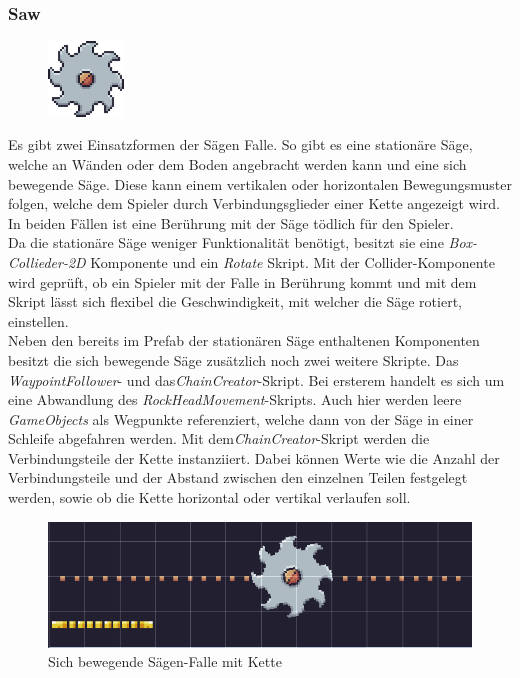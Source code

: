 \newpage

\subsubsection*{Saw}

\begin{figure}[H]
\includegraphics[width=20mm]{Figures/saw.png} 
\label{fig:saw}
\end{figure}

Es gibt zwei Einsatzformen der Sägen Falle. So gibt es eine stationäre Säge, welche an Wänden oder dem Boden angebracht werden kann und eine sich bewegende Säge. Diese kann einem vertikalen oder horizontalen Bewegungsmuster folgen, welche dem Spieler durch Verbindungsglieder einer Kette angezeigt wird. In beiden Fällen ist eine Berührung mit der Säge tödlich für den Spieler.\\

Da die stationäre Säge weniger Funktionalität benötigt, besitzt sie eine \textit{Box-Collieder-2D} Komponente und ein \textit{Rotate} Skript. Mit der Collider-Komponente wird geprüft, ob ein Spieler mit der Falle in Berührung kommt und mit dem Skript lässt sich flexibel die Geschwindigkeit, mit welcher die Säge rotiert, einstellen.\\

Neben den bereits im Prefab der stationären Säge enthaltenen Komponenten besitzt die sich bewegende Säge zusätzlich noch zwei weitere Skripte. Das \textit{WaypointFollower}- und das\textit{ChainCreator}-Skript. Bei ersterem handelt es sich um eine Abwandlung des \textit{RockHeadMovement}-Skripts. Auch hier werden leere \textit{GameObjects} als Wegpunkte referenziert, welche dann von der Säge in einer Schleife abgefahren werden. Mit dem\textit{ChainCreator}-Skript werden die Verbindungsteile der Kette instanziiert. Dabei können Werte wie die Anzahl der Verbindungsteile und der Abstand zwischen den einzelnen Teilen festgelegt werden, sowie ob die Kette horizontal oder vertikal verlaufen soll.\\

\begin{figure}[th]
\centering
\includegraphics[width=120mm]{Figures/saw-with-chain.png}
\decoRule
\caption[Bewegliche Sägen Falle]{Sich bewegende Sägen-Falle mit Kette}
\label{fig:saw-with-chain}
\end{figure}

